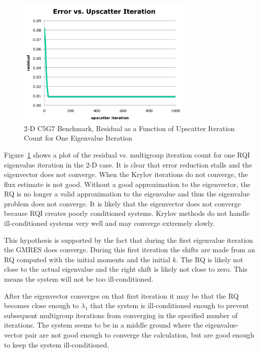 \begin{figure}[!ht]	
  \begin{center}
    \includegraphics [width=0.75\textwidth, height=0.4\textheight ] {RQIConvergenceFail}
  \end{center}
  \caption{2-D C5G7 Benchmark, Residual as a Function of Upscatter Iteration Count for One Eigenvalue Iteration}
  \label{fig:RQIConvergenceFail}
\end{figure}
%
Figure~\ref{fig:RQIConvergenceFail} shows a plot of the residual vs. multigroup iteration count for one RQI eigenvalue iteration in the 2-D case. It is clear that error reduction stalls and the eigenvector does not converge. When the Krylov iterations do not converge, the flux estimate is not good. Without a good approximation to the eigenvector, the RQ is no longer a valid approximation to the eigenvalue and thus the eigenvalue problem does not converge. It is likely that the eigenvector does not converge because RQI creates poorly conditioned systems. Krylov methods do not handle ill-conditioned systems very well and may converge extremely slowly. 

This hypothesis is supported by the fact that during the first eigenvalue iteration the GMRES does converge. During this first iteration the shifts are made from an RQ computed with the initial moments and the initial $k$. The RQ is likely not close to the actual eigenvalue and the right shift is likely not close to zero. This means the system will not be too ill-conditioned. 

After the eigenvector converges on that first iteration it may be that the RQ becomes close enough to $\lambda_{1}$ that the system is ill-conditioned enough to prevent subsequent multigroup iterations from converging in the specified number of iterations. The system seems to be in a middle ground where the eigenvalue-vector pair are not good enough to converge the calculation, but are good enough to keep the system ill-conditioned. 

